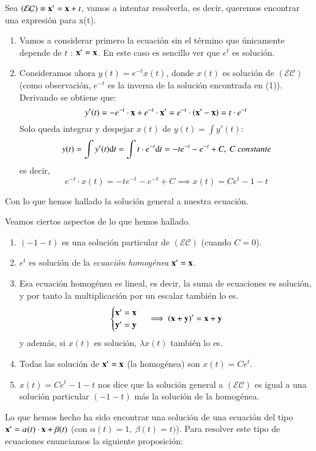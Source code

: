 \begin{eg}\label{eg:lineal-order}
    Sea $\mathcal{(EC)} \equiv \mathbf{x'} = \mathbf{x} + t$, vamos a intentar resolverla, es decir, queremos encontrar una expresión para x(t).\\
    \begin{enumerate}
        \item Vamos a considerar primero la ecuación sin el término que únicamente depende de $t$ : $\mathbf{x}' = \mathbf{x}$. En este caso es sencillo ver que $e^t$ es solución.

        \item Consideramos ahora $y(t) = e^{-t}x(t)$, donde $x(t)$ es solución de $\mathcal{(EC)}$ (como observación, $e^{-t}$ es la inversa de la solución encontrada en (1)). Derivando se obtiene que:
        $$
            y'(t) = -e^{-t}\cdot \mathbf{x} + e^{-t} \cdot \mathbf{x'} = e^{-t} \cdot (\mathbf{x'}  - \mathbf{x}) = t \cdot e^{-t}
        $$
        Solo queda integrar y despejar $x(t)$ de $y(t) = \int y'(t)$:
        $$
            y(t) = \int y'(t) \mathrm{d} t = \int t \cdot e^{-t} \mathrm{d} t = -te^{-t} - e^{-t} + C,\ C\ constante
        $$
        es decir,
        $$
            e^{-t} \cdot x(t) = -te^{-t} - e^{-t} + C \implies x(t) = Ce^t - 1 - t
        $$
    \end{enumerate}
    Con lo que hemos hallado la solución general a nuestra ecuación.
\end{eg}
\begin{obs}
    Veamos ciertos aspectos de lo que hemos hallado.\\
    \begin{enumerate}
        \item $(-1-t)$ es una solución particular de $\mathcal{(EC)}$ (cuando $C=0$).
        \item $e^t$ es solución de la \textit{ecuación homogénea} $\mathbf{x'} = \mathbf{x}$.
        \item Esa ecuación homogénea es lineal, es decir, la suma de ecuaciones es solución, y por tanto la multiplicación por un escalar también lo es.
        $$
        \begin{cases}
            \mathbf{x'} = \mathbf{x}\\ \mathbf{y'} = \mathbf{y}
        \end{cases}
        \implies (\mathbf{x}+\mathbf{y})' = \mathbf{x} + \mathbf{y}
        $$
        y además, si $x(t)$ es solución, $\lambda x(t)$ también lo es.
        \item Todas las solución de $\mathbf{x'} = \mathbf{x}$ (la homogénea) son $x(t) = Ce^t$.
        \item $x(t) = Ce^t - 1 - t$ nos dice que la solución general a $\mathcal{(EC)}$ es igual a una solución particular $(-1-t)$ más la solución de la homogénea.
    \end{enumerate}
\end{obs}
Lo que hemos hecho ha sido encontrar una solución de una ecuación del tipo $\mathbf{x'} = \alpha(t)\cdot\mathbf{x}+\beta(t)$ (con $\alpha(t) = 1,\ \beta(t) = t)$). Para resolver este tipo de ecuaciones enunciamos la siguiente proposición:

